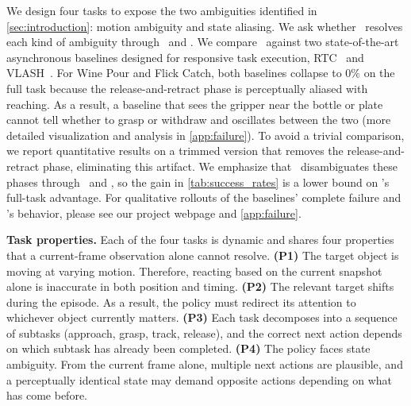 We design four tasks to expose the two ambiguities identified in \cref{sec:introduction}: motion ambiguity and state aliasing. We ask whether \ours\ resolves each kind of ambiguity through \TEMPOMOT\ and \TEMPOACT. We compare \ours\ against two state-of-the-art asynchronous baselines designed for responsive task execution, RTC~\cite{rtc} and VLASH~\cite{vlash}. For Wine Pour and Flick Catch, both baselines collapse to $0\%$ on the full task because the release-and-retract phase is perceptually aliased with reaching. As a result, a baseline that sees the gripper near the bottle or plate cannot tell whether to grasp or withdraw and oscillates between the two (more detailed visualization and analysis in \cref{app:failure}). To avoid a trivial comparison, we report quantitative results on a trimmed version that removes the release-and-retract phase, eliminating this artifact. We emphasize that \ours\ disambiguates these phases through \TEMPOMOT\ and \TEMPOACT, so the gain in \cref{tab:success_rates} is a lower bound on \ours's full-task advantage. For qualitative rollouts of the baselines' complete failure and \ours's behavior, please see our project webpage and \cref{app:failure}.

\noindent\textbf{Task properties.}\label{sec:task_properties} Each of the four tasks is dynamic and shares four properties that a current-frame observation alone cannot resolve.
  \textbf{(P1)} The target object is moving at varying motion. Therefore, reacting based on the current snapshot alone is inaccurate in both position and timing.
  \textbf{(P2)} The relevant target shifts during the episode. As a result, the policy must redirect its attention to whichever object currently matters.
  \textbf{(P3)} Each task decomposes into a sequence of subtasks (approach, grasp, track, release), and the correct next action depends on which subtask has already been completed.
  \textbf{(P4)} The policy faces state ambiguity. From the current frame alone, multiple next actions are plausible, and a perceptually identical state may demand opposite actions depending on what has come before. 


